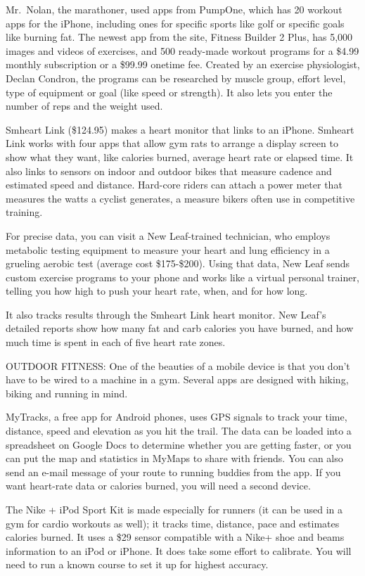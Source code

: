 ﻿\documentclass[12pt]{article}
\begin{document}
Mr.~Nolan, the marathoner, used apps from PumpOne, which has 20 workout apps for the iPhone,
including ones for specific sports like golf or specific goals like burning fat. The newest app from
the site, Fitness Builder 2 Plus, has 5,000 images and videos of exercises, and 500 ready-made
workout programs for a \$4.99 monthly subscription or a \$99.99 onetime fee. Created by an exercise
physiologist, Declan Condron, the programs can be researched by muscle group, effort level, type of
equipment or goal (like speed or strength). It also lets you enter the number of reps and the weight
used.

Smheart Link (\$124.95) makes a heart monitor that links to an iPhone. Smheart Link works with four
apps that allow gym rats to arrange a display screen to show what they want, like calories burned,
average heart rate or elapsed time. It also links to sensors on indoor and outdoor bikes that
measure cadence and estimated speed and distance. Hard-core riders can attach a power meter that
measures the watts a cyclist generates, a measure bikers often use in competitive training.

For precise data, you can visit a New Leaf-trained technician, who employs metabolic testing
equipment to measure your heart and lung efficiency in a grueling aerobic test (average cost
\$175-\$200). Using that data, New Leaf sends custom exercise programs to your phone and works like
a virtual personal trainer, telling you how high to push your heart rate, when, and for how long.

It also tracks results through the Smheart Link heart monitor. New Leaf's detailed reports show how
many fat and carb calories you have burned, and how much time is spent in each of five heart rate
zones.

OUTDOOR FITNESS: One of the beauties of a mobile device is that you don't have to be wired to a
machine in a gym. Several apps are designed with hiking, biking and running in mind.

MyTracks, a free app for Android phones, uses GPS signals to track your time, distance, speed and
elevation as you hit the trail. The data can be loaded into a spreadsheet on Google Docs to
determine whether you are getting faster, or you can put the map and statistics in MyMaps to share
with friends. You can also send an e-mail message of your route to running buddies from the app. If
you want heart-rate data or calories burned, you will need a second device.

The Nike + iPod Sport Kit is made especially for runners (it can be used in a gym for cardio
workouts as well); it tracks time, distance, pace and estimates calories burned. It uses a \$29
sensor compatible with a Nike+ shoe and beams information to an iPod or iPhone. It does take some
effort to calibrate. You will need to run a known course to set it up for highest accuracy.
\end{document}

